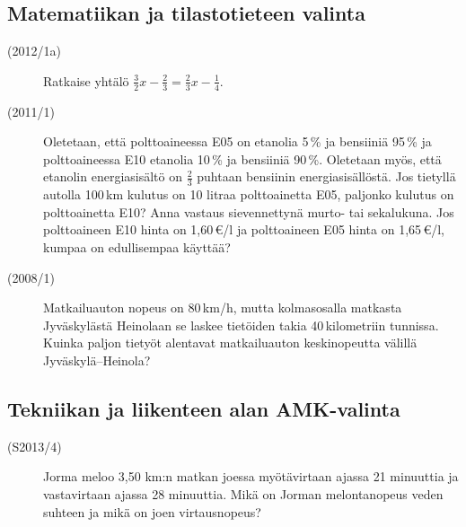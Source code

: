 \subsection*{Matematiikan ja tilastotieteen valinta}

\begin{description}
	\item[(2012/1a)] Ratkaise yhtälö $\frac{3}{2}x - \frac{2}{3} = \frac{2}{3}x - \frac{1}{4}$.
	\item[(2011/1)] Oletetaan, että polttoaineessa E05 on etanolia 5\,\% ja
        bensiiniä 95\,\% ja polttoaineessa E10 etanolia 10\,\% ja bensiiniä 90\,\%.
        Oletetaan myös, että etanolin energiasisältö on $\frac{2}{3}$ puhtaan bensiinin
		energiasisällöstä. Jos tietyllä autolla 100\,km kulutus on 10 litraa
        polttoainetta E05, paljonko kulutus on polttoainetta E10? Anna vastaus
        sievennettynä murto- tai sekalukuna. Jos polttoaineen E10 hinta on 1,60\,€/l
        ja polttoaineen E05 hinta on 1,65\,€/l, kumpaa on edullisempaa käyttää?
	\item[(2008/1)] Matkailuauton nopeus on 80\,km/h, mutta kolmasosalla matkasta
        Jyväskylästä Heinolaan se laskee tietöiden takia 40\,kilometriin tunnissa.
        Kuinka paljon tietyöt alentavat matkailuauton keskinopeutta välillä Jyväskylä--Heinola?
\end{description}

\subsection*{Tekniikan ja liikenteen alan AMK-valinta}

\begin{description}
	\item[(S2013/4)] Jorma meloo 3,50 km:n matkan joessa myötävirtaan ajassa 21 minuuttia ja 
	vastavirtaan ajassa 28 minuuttia. Mikä on Jorman melontanopeus veden suhteen ja mikä on 
	joen virtausnopeus?
\end{description}

